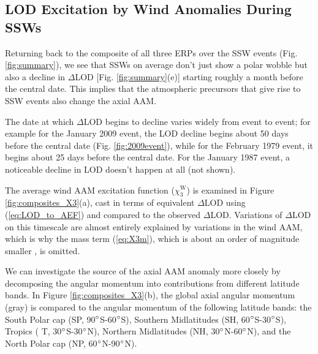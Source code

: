\documentclass[draft,jgrga]{agutex}
\begin{document}
\begin{article}
\section{LOD Excitation by Wind Anomalies During SSWs}
\label{sec:X3}

Returning back to the composite of all three ERPs over the SSW events (Fig. \ref{fig:summary}), we see that SSWs on average don't just show a polar wobble but also a decline in $\Delta$LOD [Fig. \ref{fig:summary}(e)] starting roughly a month before the central date.
This implies that the atmospheric precursors that give rise to SSW events also change the axial AAM.

The date at which $\Delta$LOD begins to decline varies widely from event to event; for example for the January 2009 event, the LOD decline begins about 50 days before the central date (Fig. \ref{fig:2009event}), while for the February 1979 event, it begins about 25 days before the central date.
For the January 1987 event, a noticeable decline in LOD doesn't happen at all (not shown).  

 {The average wind AAM excitation function} ($\chi_3^{\text{W}}$)  {is examined in} Figure \ref{fig:composites_X3}(a),  cast in terms of equivalent $\Delta$LOD using (\ref{eq:LOD_to_AEF}) and compared to the observed $\Delta$LOD.
Variations of $\Delta$LOD on this timescale are almost entirely explained by variations in the wind AAM, which is why the mass term (\ref{eq:X3m}), which is about an order of magnitude smaller  \citep{eubanksetal1985}, is omitted.


We can investigate the source of  {the axial AAM} anomaly more closely by decomposing the angular momentum into contributions from different latitude bands. 
In Figure \ref{fig:composites_X3}(b), the global axial angular momentum (gray) is compared to the angular momentum of the following latitude bands:
the South Polar cap (SP, 90$^\circ$S-60$^\circ$S), 
Southern Midlatitudes (SH, 60$^\circ$S-30$^\circ$S), 
Tropics ( {T}, 30$^\circ$S-30$^\circ$N), 
Northern Midlatitudes (NH, 30$^\circ$N-60$^\circ$N), and the 
North Polar cap (NP, 60$^\circ$N-90$^\circ$N).


\end{article}
\end{document}
